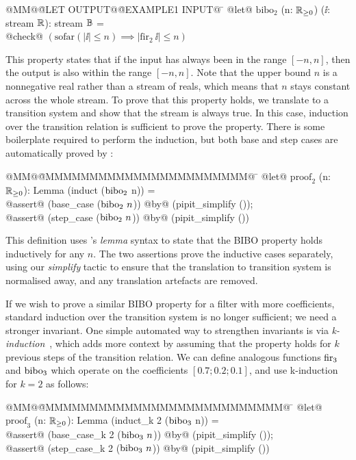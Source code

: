 \documentclass[sigplan,screen, review]{acmart}
\begin{document}
\begin{tabbing}
  @MM@\= @LET OUTPUT@\= @EXAMPLE1 INPUT@ \= \kill
  @let@ $\mbox{bibo}_2$ (n: $\mathbb{R}_{\ge0}$) ($\ii$: stream $\mathbb{R}$): stream $\mathbb{B}$ = \\
  \> @check@ $(\mbox{sofar}(|\ii| \le n) \implies |\mbox{fir}_2~\ii| \le n)$
\end{tabbing}

This property states that
  if the input has always been in the range $[-n, n]$, then the output is also within the range $[-n, n]$.
Note that the upper bound $n$ is a nonnegative real rather than a stream of reals, which means that $n$ stays constant across the whole stream.
To prove that this property holds, we translate to a transition system and show that the stream is always true.
In this case, induction over the transition relation is sufficient to prove the property.
There is some boilerplate required to perform the induction, but both base and step cases are automatically proved by \fstar{}:

\begin{tabbing}
  @MM@\= @MMMMMMMMMMMMMMMMMMMMMMM@ \= \kill
  @let@ $\mbox{proof}_2$ (n: $\mathbb{R}_{\ge0}$): Lemma (induct ($\mbox{bibo}_2$ n)) = \\
  \> @assert@ (base\_case ($\mbox{bibo}_2 ~n$)) \> @by@ (pipit\_simplify ()); \\
  \> @assert@ (step\_case ($\mbox{bibo}_2 ~n$)) \> @by@ (pipit\_simplify ())
\end{tabbing}

This definition uses \fstar{}'s \emph{lemma} syntax to state that the BIBO property holds inductively for any $n$.
The two assertions prove the inductive cases separately, using our \emph{simplify} tactic to ensure that the translation to transition system is normalised away, and any translation artefacts are removed.

If we wish to prove a similar BIBO property for a filter with more coefficients, standard induction over the transition system is no longer sufficient; we need a stronger invariant.
One simple automated way to strengthen invariants is via \emph{k-induction}~\cite{hagen2008scaling}, which adds more context by assuming that the property holds for $k$ previous steps of the transition relation.
We can define analogous functions $\mbox{fir}_3$ and $\mbox{bibo}_3$ which operate on the coefficients $[0.7; 0.2; 0.1]$, and use k-induction for $k = 2$ as follows:

\begin{tabbing}
  @MM@\= @MMMMMMMMMMMMMMMMMMMMMMMMMMM@ \= \kill
  @let@ $\mbox{proof}_3$ (n: $\mathbb{R}_{\ge0}$): Lemma (induct\_k 2 ($\mbox{bibo}_3$ n)) = \\
  \> @assert@ (base\_case\_k 2 ($\mbox{bibo}_3 ~n$)) \> @by@ (pipit\_simplify ()); \\
  \> @assert@ (step\_case\_k 2 ($\mbox{bibo}_3 ~n$)) \> @by@ (pipit\_simplify ())
\end{tabbing}
\end{document}
